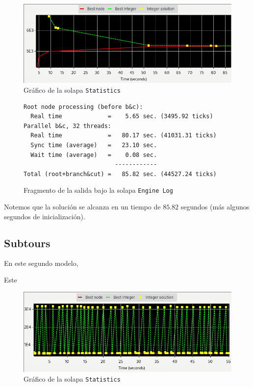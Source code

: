 \documentclass[titlepage,a4paper,oneside]{article}
\begin{document}
\begin{figure}[H]
\centering
\includegraphics[width=\textwidth]{images/MTZ.png}
\caption{Gráfico de la solapa \texttt{Statistics}}
\end{figure}

\begin{figure}[H]
\begin{verbatim}
Root node processing (before b&c):
  Real time             =    5.65 sec. (3495.92 ticks)
Parallel b&c, 32 threads:
  Real time             =   80.17 sec. (41031.31 ticks)
  Sync time (average)   =   23.10 sec.
  Wait time (average)   =    0.08 sec.
                          ------------
Total (root+branch&cut) =   85.82 sec. (44527.24 ticks)
\end{verbatim}
\caption{Fragmento de la salida bajo la solapa \texttt{Engine Log}}
\end{figure}

Notemos que la solución se alcanza en un tiempo de $85.82$ segundos (más algunos segundos de inicialización).

\subsection{Subtours}\label{Subtours}
En este segundo modelo,

Este

\begin{figure}[H]
\centering
\includegraphics[width=\textwidth]{images/subtours.png}
\caption{Gráfico de la solapa \texttt{Statistics}}
\end{figure}
\end{document}
